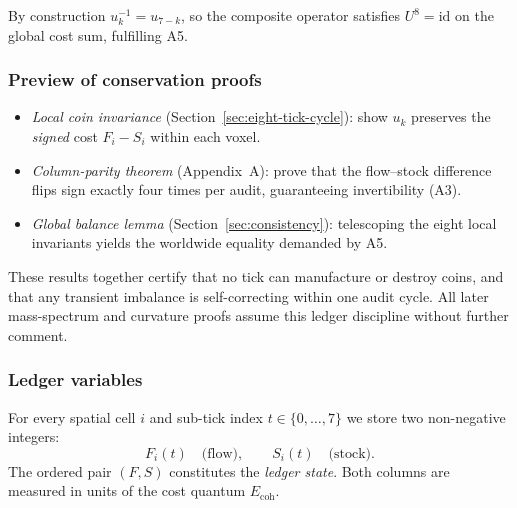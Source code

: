 \documentclass[11pt,oneside]{book}
\begin{document}
By construction \(u_{k}^{-1}=u_{7-k}\), so the composite operator satisfies
\(U^{8}=\mathrm{id}\) on the global cost sum, fulfilling A5.

\subsubsection{Preview of conservation proofs}
\label{subsubsec:conservation-preview}
\begin{itemize}
  \item \emph{Local coin invariance}  
        (Section~\ref{sec:eight-tick-cycle}):  
        show \(u_{k}\) preserves the \emph{signed} cost
        \(F_{i}-S_{i}\) within each voxel.
  \item \emph{Column-parity theorem}  
        (Appendix~A): prove that the flow–stock difference flips sign exactly
        four times per audit, guaranteeing invertibility (A3).
  \item \emph{Global balance lemma}  
        (Section~\ref{sec:consistency}):  
        telescoping the eight local invariants yields the
        worldwide equality demanded by A5.
\end{itemize}

These results together certify that no tick can manufacture or destroy coins,
and that any transient imbalance is self-correcting within one audit cycle.
All later mass-spectrum and curvature proofs assume this ledger discipline
without further comment.


\subsubsection{Ledger variables}
\label{subsubsec:ledger-vars}
For every spatial cell \(i\) and sub-tick index \(t\in\{0,\dots,7\}\) we store
two non-negative integers:
\[
  F_{i}(t) \quad\text{(flow)} ,\qquad
  S_{i}(t) \quad\text{(stock)} .
\]
The ordered pair \((F,S)\) constitutes the \emph{ledger state}.  
Both columns are measured in units of the cost quantum \(E_{\text{coh}}\).

\end{document}
